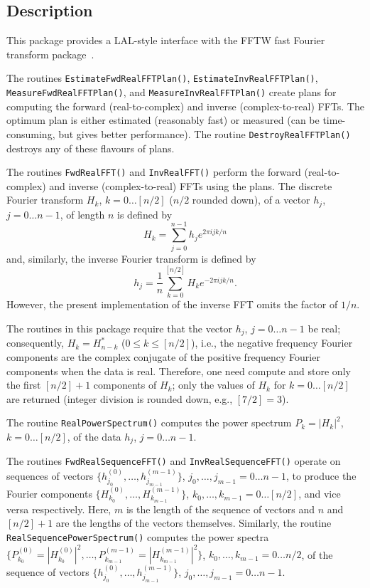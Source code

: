 \documentclass{article}
\begin{document}
\subsection{Description}

This package provides a LAL-style interface with the FFTW fast Fourier
transform package~\cite{fj:1998}.

The routines \texttt{EstimateFwdRealFFTPlan()},
\texttt{EstimateInvRealFFTPlan()}, \texttt{MeasureFwdRealFFTPlan()}, and
\texttt{MeasureInvRealFFTPlan()} create plans for computing the forward
(real-to-complex) and inverse (complex-to-real) FFTs.  The optimum plan is
either estimated (reasonably fast) or measured (can be time-consuming, but
gives better performance).  The routine \texttt{DestroyRealFFTPlan()} destroys
any of these flavours of plans.

The routines \texttt{FwdRealFFT()} and \texttt{InvRealFFT()} perform the
forward (real-to-complex) and inverse (complex-to-real) FFTs using the plans.
The discrete Fourier transform $H_k$, $k=0\ldots [n/2]$ ($n/2$ rounded down),
of a vector $h_j$, $j=0\ldots n-1$, of length $n$ is defined by
\[
  H_k = \sum_{j=0}^{n-1} h_j e^{2\pi ijk/n}
\]
and, similarly, the inverse Fourier transform is defined by
\[
  h_j = \frac{1}{n}\sum_{k=0}^{[n/2]} H_k e^{-2\pi ijk/n}.
\]
However, the present implementation of the inverse FFT omits the factor of
$1/n$.

The routines in this package require that the vector $h_j$, $j=0\ldots n-1$ be
real; consequently, $H_k=H_{n-k}^\ast$ ($0\le k\le[n/2]$), i.e., the negative
frequency Fourier components are the complex conjugate of the positive
frequency Fourier components when the data is real.  Therefore, one need
compute and store only the first $[n/2]+1$ components of $H_k$; only
the values of $H_k$ for $k=0\ldots [n/2]$ are returned (integer division is
rounded down, e.g., $[7/2]=3$).

The routine \texttt{RealPowerSpectrum()} computes the power spectrum
$P_k=|H_k|^2$, $k=0\ldots [n/2]$, of the data $h_j$, $j=0\ldots n-1$.

The routines \texttt{FwdRealSequenceFFT()} and \texttt{InvRealSequenceFFT()}
operate on sequences of vectors
$\{h^{(0)}_{j_0},\ldots,h^{(m-1)}_{j_{m-1}}\}$, $j_0,\ldots,j_{m-1}=0\ldots
n-1$, to produce the Fourier components
$\{H^{(0)}_{k_0},\ldots,H^{(m-1)}_{k_{m-1}}\}$, $k_0,\ldots,k_{m-1}=0\ldots
[n/2]$, and vice versa respectively.  Here, $m$ is the length of the sequence
of vectors and $n$ and $[n/2]+1$ are the lengths of the vectors themselves.
Similarly, the routine \texttt{RealSequencePowerSpectrum()} computes the power
spectra $\{P^{(0)}_{k_0}=|H^(0)_{k_0}|^2,\ldots,P^{(m-1)}_{k_{m-1}}=
|H^{(m-1)}_{k_{m-1}}|^2\}$, $k_0,\ldots,k_{m-1}=0\ldots n/2$, of the sequence
of vectors $\{h^{(0)}_{j_0},\ldots,h^{(m-1)}_{j_{m-1}}\}$,
$j_0,\ldots,j_{m-1}=0\ldots n-1$.
\end{document}
